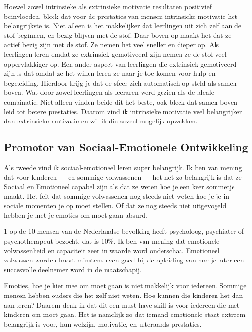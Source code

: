 \documentclass{article}
\begin{document}
            Hoewel zowel intrinsieke als extrinsieke motivatie resultaten positivief beinvloeden, bleek dat voor de prestaties van mensen intrinsieke motivatie het belangrijkste is.\cite{intrinsic-motivation-is-more-important} Niet alleen is het makkelijker dat leerlingen uit zich zelf aan de stof beginnen, en bezig blijven met de stof. Daar boven op maakt het dat ze actief bezig zijn met de stof. Ze nemen het veel sneller en dieper op. Als leerlingen leren omdat ze extrinsiek gemotiveerd zijn nemen ze de stof veel oppervlakkiger op\cite{extrinsic-motivation-results-in-supperfical-learning}. Een ander aspect van leerlingen die extrinsiek gemotiveerd zijn is dat omdat ze het willen leren ze naar je toe komen voor hulp en begeleiding. Hierdoor krijg je dat de sfeer zich automatisch op steld als samen-boven. Wat door zowel leerlingen als leeraren werd gezien als de ideale combinatie. Niet alleen vinden beide dit het beste, ook bleek dat samen-boven leid tot betere prestaties.\cite{samen-boven-leads-to-better-results} Daarom vind ik intrinsieke motivatie veel belangrijker dan extrinsieke motivatie en wil ik die zoveel mogelijk opwekken. 
        
        \subsection{Promotor van Sociaal-Emotionele Ontwikkeling}

            Als tweede vind ik sociaal-emotioneel leren super belangrijk. Ik ben van mening dat voor kinderen — en sommige volwassenen — het net zo belangrijk is dat ze Sociaal en Emotioneel capabel zijn als dat ze weten hoe je een keer sommetje maakt. Het feit dat sommige volwassenen nog steeds niet weten hoe je je in sociale momenten je op moet stellen. Of dat ze nog steeds niet uitgevogeld hebben je met je emoties om moet gaan absurd.
            
            1 op de 10 mensen van de Nederlandse bevolking heeft psycholoog, psychiater of psychotherapeut bezocht, dat is 10\%.\cite{1-in-10-pygy} Ik ben van mening dat emotionele volwassenheid en capaciteit zeer in waarde word onderschat. Emotioneel volwassen worden hoort minstens even goed bij de opleiding van hoe je later een succesvolle deelnemer word in de maatschapij.
            
            Emoties, hoe je hier mee om moet gaan is niet makkelijk voor iedereen. Sommige mensen hebben ouders die het zelf niet weten. Hoe kunnen die kinderen het dan aan leren? Daarom denk ik dat dit een must have skill is voor iedereen die met kinderen om moet gaan. Het is namelijk zo dat iemand emotionele staat extreem belangrijk is voor, hun welzijn, motivatie, en uiteraards prestaties. 
            
\end{document}
